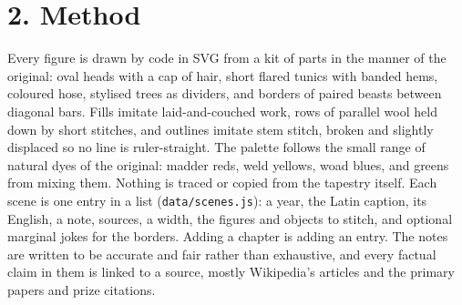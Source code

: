 \documentclass[11pt,a4paper]{article}
\begin{document}
\section*{2. Method}
Every figure is drawn by code in SVG from a kit of parts in the manner of the original: oval heads with a cap of hair, short flared tunics with banded hems, coloured hose, stylised trees as dividers, and borders of paired beasts between diagonal bars. Fills imitate laid-and-couched work, rows of parallel wool held down by short stitches, and outlines imitate stem stitch, broken and slightly displaced so no line is ruler-straight. The palette follows the small range of natural dyes of the original: madder reds, weld yellows, woad blues, and greens from mixing them. Nothing is traced or copied from the tapestry itself.
Each scene is one entry in a list (\texttt{data/scenes.js}): a year, the Latin caption, its English, a note, sources, a width, the figures and objects to stitch, and optional marginal jokes for the borders. Adding a chapter is adding an entry. The notes are written to be accurate and fair rather than exhaustive, and every factual claim in them is linked to a source, mostly Wikipedia's articles and the primary papers and prize citations.
\end{document}
